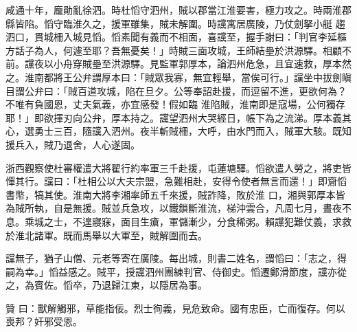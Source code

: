 \begin{pinyinscope}
 咸通十年，龐勛亂徐泗。時杜慆守泗州，賊以郡當江淮要害，極力攻之。時兩淮郡縣皆陷。慆守臨淮久之，援軍雖集，賊未解圍。時讜寓居廣陵，乃仗劍拏小艇
 趨泗口，貫城柵入城見慆。慆素聞有義而不相面，喜讜至，握手謝曰：「判官李延樞方話子為人，何遽至耶？吾無憂矣！」時賊三面攻城，王師結壘於洪源驛。相顧不前。讜夜以小舟穿賊壘至洪源驛。見監軍郭厚本，論泗州危急，且宜速救，厚本然之。淮南都將王公弁謂厚本曰：「賊眾我寡，無宜輕舉，當俟可行。」讜坐中拔劍瞋目謂公弁曰：「賊百道攻城，陷在旦夕。公等奉詔赴援，而逗留不進，更欲何為？不唯有負國恩，丈夫氣義，亦宜感發！假如臨
 淮陷賊，淮南即是寇場，公何獨存耶！」即欲揮刃向公弁，厚本持之。讜望泗州大哭經日，帳下為之流涕。厚本義其心，選勇士三百，隨讜入泗州。夜半斬賊柵，大呼，由水門而入，賊軍大駭。既知援兵入，賊乃退舍，人心遂固。



 浙西觀察使杜審權遣大將翟行約率軍三千赴援，屯蓮塘驛。慆欲遣人勞之，將吏皆憚其行。讜曰：「杜相公以大夫宗盟，急難相赴，安得令使者無言而還！」即齎慆書幣，犒其使。淮南大將李湘率師五千來援，賊詐降，敗於淮
 口，湘與郭厚本皆為賊所執，自是無援。賊並兵急攻，以鐵鎖斷淮流，梯沖雲合，凡周七月，晝夜不息。乘城之士，不遑寢寐，面目生瘡，軍儲漸少，分食稀粥。賴讜犯難仗義，求救於淮北諸軍。既而馬舉以大軍至，賊解圍而去。



 讜無子，猶子山僧、元老等寄在廣陵。每出城，則書二姓名，謂慆曰：「志之，得嗣為幸。」慆益感之。賊平，授讜泗州團練判官、侍御史。慆遷鄭滑節度，讜亦從之，為賓佐。慆卒，乃退歸江東，以隱居為事。



 贊
 曰：獸解觸邪，草能指佞。烈士徇義，見危致命。國有忠臣，亡而復存。何以喪邦？奸邪受恩。



\end{pinyinscope}